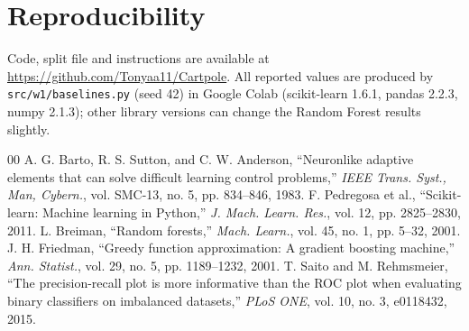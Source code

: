 \documentclass[conference]{IEEEtran}
\begin{document}
\section*{Reproducibility}
Code, split file and instructions are available at \url{https://github.com/Tonyaa11/Cartpole}. All
reported values are produced by \texttt{src/w1/baselines.py} (seed 42) in Google Colab
(scikit-learn 1.6.1, pandas 2.2.3, numpy 2.1.3); other library versions can change the
Random Forest results slightly.

\begin{thebibliography}{00}
 A. G. Barto, R. S. Sutton, and C. W. Anderson, ``Neuronlike adaptive elements that can solve difficult learning control problems,'' \emph{IEEE Trans. Syst., Man, Cybern.}, vol. SMC-13, no. 5, pp. 834--846, 1983.
 F. Pedregosa et al., ``Scikit-learn: Machine learning in Python,'' \emph{J. Mach. Learn. Res.}, vol. 12, pp. 2825--2830, 2011.
 L. Breiman, ``Random forests,'' \emph{Mach. Learn.}, vol. 45, no. 1, pp. 5--32, 2001.
 J. H. Friedman, ``Greedy function approximation: A gradient boosting machine,'' \emph{Ann. Statist.}, vol. 29, no. 5, pp. 1189--1232, 2001.
 T. Saito and M. Rehmsmeier, ``The precision-recall plot is more informative than the ROC plot when evaluating binary classifiers on imbalanced datasets,'' \emph{PLoS ONE}, vol. 10, no. 3, e0118432, 2015.
\end{thebibliography}
\end{document}
